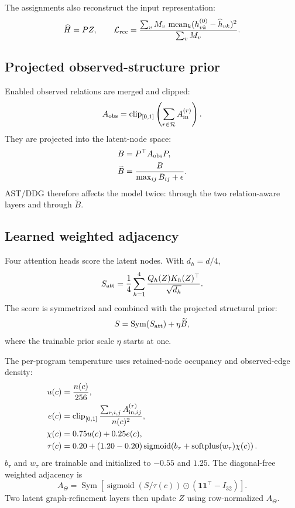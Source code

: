 \documentclass[11pt,a4paper]{article}
\newcommand{\sigmoid}{\operatorname{sigmoid}}
\newcommand{\sym}{\operatorname{Sym}}
\newcommand{\mean}{\operatorname{mean}}
\begin{document}
The assignments also reconstruct the input representation:
\begin{equation}
\widehat H=PZ,
\qquad
\mathcal L_{\rm rec}
=\frac{\sum_vM_v\,\mean_k(h_{vk}^{(0)}-\widehat h_{vk})^2}
{\sum_vM_v}.
\end{equation}

\subsection{Projected observed-structure prior}

Enabled observed relations are merged and clipped:
\begin{equation}
A_{\rm obs}=\operatorname{clip}_{[0,1]}
\left(\sum_{r\in\mathcal R}A_{\rm in}^{(r)}\right).
\end{equation}
They are projected into the latent-node space:
\begin{align}
B&=P^\top A_{\rm obs}P,\\
\widetilde B&=\frac{B}{\max_{ij}B_{ij}+\epsilon}.
\end{align}
AST/DDG therefore affects the model twice: through the two relation-aware layers
and through $\widetilde B$.

\subsection{Learned weighted adjacency}

Four attention heads score the latent nodes. With $d_h=d/4$,
\begin{equation}
S_{\rm att}
=\frac{1}{4}\sum_{h=1}^{4}
\frac{Q_h(Z)K_h(Z)^\top}{\sqrt{d_h}}.
\end{equation}
The score is symmetrized and combined with the projected structural prior:
\begin{equation}
S=\sym(S_{\rm att})+\eta\widetilde B,
\end{equation}
where the trainable prior scale $\eta$ starts at one.

The per-program temperature uses retained-node occupancy and observed-edge
density:
\begin{align}
u(c)&=\frac{n(c)}{256},\\
e(c)&=\operatorname{clip}_{[0,1]}
\frac{\sum_{r,i,j}A_{{\rm in},ij}^{(r)}}{n(c)^2},\\
\chi(c)&=0.75u(c)+0.25e(c),\\
\tau(c)&=0.20+(1.20-0.20)
\sigmoid\!\left(b_\tau+\operatorname{softplus}(w_\tau)\chi(c)\right).
\end{align}
$b_\tau$ and $w_\tau$ are trainable and initialized to $-0.55$ and $1.25$.
The diagonal-free weighted adjacency is
\begin{equation}
A_\Theta=
\sym\!\left[
\sigmoid\!\left(S/\tau(c)\right)
\odot(\mathbf1\mathbf1^\top-I_{32})
\right].
\end{equation}
Two latent graph-refinement layers then update $Z$ using row-normalized
$A_\Theta$.
\end{document}
